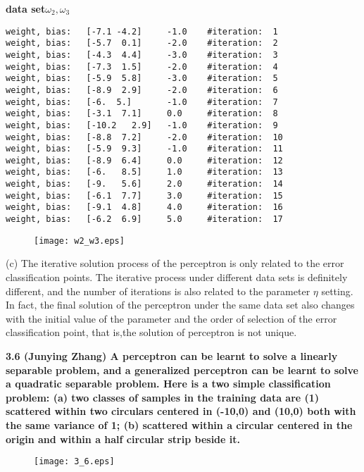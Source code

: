 \noindent \textbf{data set$\omega_2,\omega_3$}
\begin{lstlisting}
weight, bias:   [-7.1 -4.2]     -1.0    #iteration:  1
weight, bias:   [-5.7  0.1]     -2.0    #iteration:  2
weight, bias:   [-4.3  4.4]     -3.0    #iteration:  3
weight, bias:   [-7.3  1.5]     -2.0    #iteration:  4
weight, bias:   [-5.9  5.8]     -3.0    #iteration:  5
weight, bias:   [-8.9  2.9]     -2.0    #iteration:  6
weight, bias:   [-6.  5.]       -1.0    #iteration:  7
weight, bias:   [-3.1  7.1]     0.0     #iteration:  8
weight, bias:   [-10.2   2.9]   -1.0    #iteration:  9
weight, bias:   [-8.8  7.2]     -2.0    #iteration:  10
weight, bias:   [-5.9  9.3]     -1.0    #iteration:  11
weight, bias:   [-8.9  6.4]     0.0     #iteration:  12
weight, bias:   [-6.   8.5]     1.0     #iteration:  13
weight, bias:   [-9.   5.6]     2.0     #iteration:  14
weight, bias:   [-6.1  7.7]     3.0     #iteration:  15
weight, bias:   [-9.1  4.8]     4.0     #iteration:  16
weight, bias:   [-6.2  6.9]     5.0     #iteration:  17
\end{lstlisting}
\begin{figure}[h]
  \centering
  \texttt{[image: w2\_w3.eps]}
\end{figure}

\noindent(c) The iterative solution process of the perceptron is only related to the error classification points. The iterative process under different data sets is definitely different, and the number of iterations is also related to the parameter $\eta$ setting. In fact, the final solution of the perceptron under the same data set also changes with the initial value of the parameter and the order of selection of the error classification point, that is,the solution of perceptron is not unique.


\newpage

\noindent \textbf{3.6 (Junying Zhang) A perceptron can be learnt to solve a linearly separable problem, and a generalized
perceptron can be learnt to solve a quadratic separable problem. Here is a two simple classification
problem: (a) two classes of samples in the training data are (1) scattered within two circulars centered in
(-10,0) and (10,0) both with the same variance of 1; (b) scattered within a circular centered in the origin
and within a half circular strip beside it.}

\begin{figure}[h]
  \centering
  \texttt{[image: 3\_6.eps]}
\end{figure}


